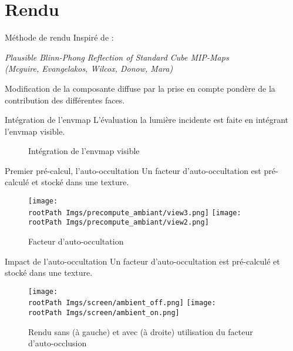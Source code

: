 \documentclass{beamer}
\newcommand*{\rootPath}{}
\begin{document}
\section{Rendu}

\begin{frame}{Méthode de rendu}
	Inspiré de :
	\begin{center}\emph{Plausible Blinn-Phong Reflection of Standard Cube MIP-Maps\\(Mcguire, Evangelakos, Wilcox, Donow, Mara)}\end{center}
	Modification de la composante diffuse par la prise en compte pondère de la contribution des différentes faces.
\end{frame}

\begin{frame}{Intégration de l'envmap}
	L'évaluation la lumière incidente est faite en intégrant l'envmap visible.
	\begin{figure}[!ht]
		\centering
		
		\caption{Intégration de l'envmap visible}
	\end{figure}
\end{frame}	

\begin{frame}{Premier pré-calcul, l'auto-occultation}
	Un facteur d'auto-occultation est pré-calculé et stocké dans une texture.
	\begin{figure}[!ht]
		\centering
			\texttt{[image: \\rootPath Imgs/precompute\_ambiant/view3.png]}
			\hspace{0.5cm}
			\texttt{[image: \\rootPath Imgs/precompute\_ambiant/view2.png]}
		\caption{Facteur d'auto-occultation}
	\end{figure}	
\end{frame}

\begin{frame}{Impact de l'auto-occultation}
	Un facteur d'auto-occultation est pré-calculé et stocké dans une texture.
	\begin{figure}[!ht]
		\centering
			\texttt{[image: \\rootPath Imgs/screen/ambient\_off.png]}
			\hspace{0.5cm}
			\texttt{[image: \\rootPath Imgs/screen/ambient\_on.png]}
		\caption{Rendu sans (à gauche) et avec (à droite) utilisation du facteur d'auto-occlusion}
	\end{figure}	
\end{frame}	
\end{document}

